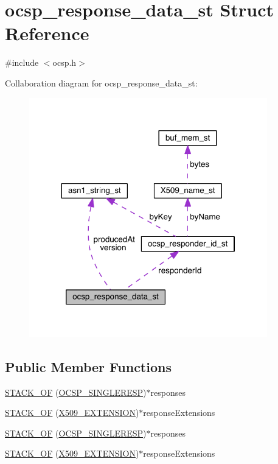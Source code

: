 \hypertarget{structocsp__response__data__st}{}\section{ocsp\+\_\+response\+\_\+data\+\_\+st Struct Reference}
\label{structocsp__response__data__st}


{\ttfamily \#include $<$ocsp.\+h$>$}



Collaboration diagram for ocsp\+\_\+response\+\_\+data\+\_\+st\+:\nopagebreak
\begin{figure}[H]
\begin{center}
\leavevmode
\includegraphics[width=293pt]{structocsp__response__data__st__coll__graph}
\end{center}
\end{figure}
\subsection*{Public Member Functions}
\begin{DoxyCompactItemize}
\item 
\hyperlink{structocsp__response__data__st_abd8efbb2d87207c387b49eb6696c2d87}{S\+T\+A\+C\+K\+\_\+\+OF} (\hyperlink{crypto_2ocsp_2ocsp_8h_a4a71db108c4230135b5df52537e65c3f}{O\+C\+S\+P\+\_\+\+S\+I\+N\+G\+L\+E\+R\+E\+SP})$\ast$responses
\item 
\hyperlink{structocsp__response__data__st_ab63b7e2cf3aeffd652dcf5aa78c964da}{S\+T\+A\+C\+K\+\_\+\+OF} (\hyperlink{crypto_2x509_2x509_8h_ab2f7f7dc0ced8684e0cbfc818e408304}{X509\+\_\+\+E\+X\+T\+E\+N\+S\+I\+ON})$\ast$response\+Extensions
\item 
\hyperlink{structocsp__response__data__st_abd8efbb2d87207c387b49eb6696c2d87}{S\+T\+A\+C\+K\+\_\+\+OF} (\hyperlink{crypto_2ocsp_2ocsp_8h_a4a71db108c4230135b5df52537e65c3f}{O\+C\+S\+P\+\_\+\+S\+I\+N\+G\+L\+E\+R\+E\+SP})$\ast$responses
\item 
\hyperlink{structocsp__response__data__st_ab63b7e2cf3aeffd652dcf5aa78c964da}{S\+T\+A\+C\+K\+\_\+\+OF} (\hyperlink{crypto_2x509_2x509_8h_ab2f7f7dc0ced8684e0cbfc818e408304}{X509\+\_\+\+E\+X\+T\+E\+N\+S\+I\+ON})$\ast$response\+Extensions
\end{DoxyCompactItemize}
